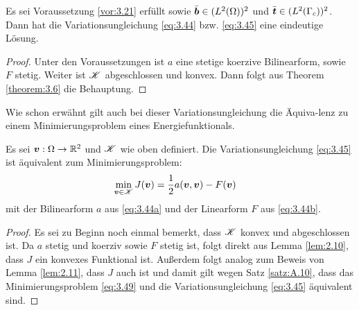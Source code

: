 \begin{theorem}\label{theorem:3.22}
Es sei Voraussetzung \ref{vor:3.21} erfüllt sowie $\bar{\boldsymbol b}  \in (L^2(\Omega))^2$ und $\bar{\boldsymbol t} \in (L^2(\Gamma_c))^2$. Dann hat die Variationsungleichung \eqref{eq:3.44} bzw. \eqref{eq:3.45} eine eindeutige Lösung.
\end{theorem}

\begin{proof}
Unter den Voraussetzungen ist $a$ eine stetige koerzive Bilinearform, sowie $F$ stetig. Weiter ist $\mathscr K$ abgeschlossen und konvex. Dann folgt aus Theorem \ref{theorem:3.6} die Behauptung.
\end{proof}


Wie schon erwähnt gilt auch bei dieser Variationsungleichung die Äquiva-lenz zu einem Minimierungsproblem eines Energiefunktionals. 


\begin{theorem}\label{theorem:3.23}
Es sei $\boldsymbol v : \Omega \rightarrow \mathbb{R}^2$ und $\mathscr K$ wie oben definiert. Die Variationsungleichung \eqref{eq:3.45} ist äquivalent zum Minimierungsproblem:
\begin{align}\label{eq:3.49}
	\min_{\boldsymbol v \in \mathscr K} J(\boldsymbol v)& = \frac 1 2 a(\boldsymbol v, \boldsymbol v)-F(\boldsymbol v)
\end{align}
mit der Bilinearform $a$ aus \eqref{eq:3.44a} und der Linearform $F$ aus \eqref{eq:3.44b}.
\end{theorem}

\begin{proof}
Es sei zu Beginn noch einmal bemerkt, dass $\mathscr K$ konvex und abgeschlossen ist. Da $a$ stetig und koerziv sowie $F$ stetig ist, folgt direkt aus Lemma \ref{lem:2.10}, dass $J$ ein konvexes Funktional ist. Außerdem folgt analog zum Beweis von Lemma \ref{lem:2.11}, dass $J$ auch  ist und damit gilt wegen Satz \ref{satz:A.10}, dass das Minimierungsproblem \eqref{eq:3.49} und die Variationsungleichung \eqref{eq:3.45} äquivalent sind.
\end{proof}



